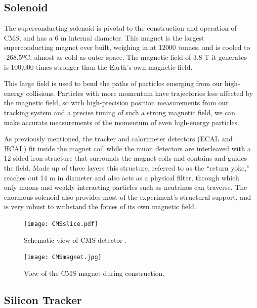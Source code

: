 \subsection{Solenoid}
The superconducting solenoid is pivotal to the construction and operation of CMS, and has a 6 m internal diameter.
This magnet is the largest superconducting magnet ever built, weighing in at 12000 tonnes, and is cooled to -268.5ºC, almost as cold as outer space. 
The magnetic field of 3.8 T it generates is 100,000 times stronger than the Earth’s own magnetic field.

This large field is used to bend the paths of particles emerging from our high-energy collisions. Particles with more momentum have trajectories less affected by the magnetic field, so with high-precision position measurements from our tracking system and a precise tuning of such a strong magnetic field, we can make accurate measurements of the momentum of even high-energy particles. 

As previously mentioned, the tracker and calorimeter detectors (ECAL and HCAL) fit inside the magnet coil while the muon detectors are interleaved with a 12-sided iron structure that surrounds the magnet coils and contains and guides the field. Made up of three layers this structure, referred to as the ``return yoke,'' reaches out 14 m in diameter and also acts as a physical filter, through which only muons and weakly interacting particles such as neutrinos can traverse. The enormous solenoid also provides most of the experiment’s structural support, and is very robust to withstand the forces of its own magnetic field.

\begin{figure}[!ht]
    \begin{center}
        \texttt{[image: CMSslice.pdf]}
        \caption{Schematic view of CMS detector \cite{CMS}.}
        \label{fig:cmscutaway2}
    \end{center}
\end{figure}

\begin{figure}[!ht]
    \begin{center}
        \texttt{[image: CMSmagnet.jpg]}
        \caption{View of the CMS magnet during construction.}
        \label{fig:CMSmagnet}
    \end{center}
\end{figure}

\subsection{Silicon Tracker}

